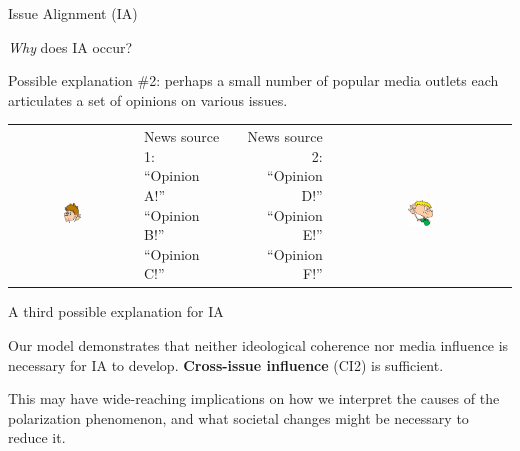 \documentclass[12pt]{beamer}
\begin{document}
\begin{frame}[c]{Issue Alignment (IA)} %

\textit{Why} does IA occur?

Possible explanation \#2: perhaps a small number of popular media
outlets each articulates a set of opinions on various issues. 

\pause
\begin{center}
\begin{tabular}{clp{1cm}rc}
\makecell{
\\
\includegraphics[width=0.15\textwidth]{listener1.jpg}
} &
\makecell{
News source 1:  \\
``Opinion A!'' \\
``Opinion B!'' \\
``Opinion C!'' \\} & &
\makecell{
News source 2:  \\
``Opinion D!'' \\
``Opinion E!'' \\
``Opinion F!'' \\} & 
\makecell{
\\
\includegraphics[width=0.15\textwidth]{listener2.jpg}
}
\end{tabular}
\end{center}


\end{frame}

\begin{frame}[c]{A third possible explanation for IA} %

\large
Our model demonstrates that neither ideological coherence nor media influence
is necessary for IA to develop. \textbf{Cross-issue influence} (CI2) is
sufficient.

\pause
\normalsize
\bigskip

This may have wide-reaching implications on how we interpret the causes of the
polarization phenomenon, and what societal changes might be necessary to reduce
it.

\end{frame}
\end{document}
